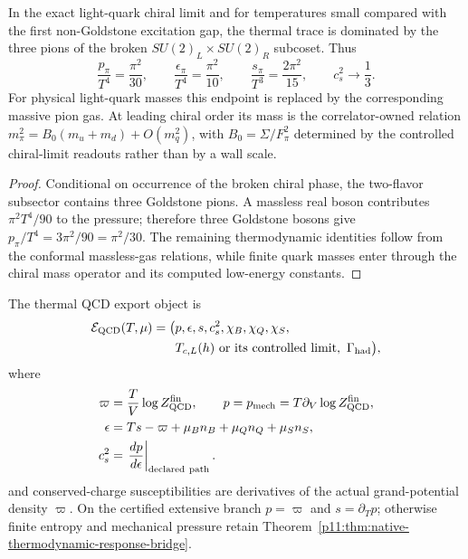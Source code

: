 \documentclass[12pt,a4paper]{article}
\begin{document}
\begin{theorem}
\label{p11:thm:native-low-temperature-pion-gas}
In the exact light-quark chiral limit and for temperatures small compared with the first non-Goldstone excitation gap, the
thermal trace is dominated by the three pions of the broken
\(SU(2)_L\times SU(2)_R\) subcoset.  Thus
\begin{equation}
\label{p11:eq:pion-gas-pressure}
\frac{p_\pi}{T^4}=\frac{\pi^2}{30},
\qquad
\frac{\epsilon_\pi}{T^4}=\frac{\pi^2}{10},
\qquad
\frac{s_\pi}{T^3}=\frac{2\pi^2}{15},
\qquad
c_s^2\to\frac13 .
\end{equation}
For physical light-quark masses this endpoint is replaced by the corresponding
massive pion gas.  At leading chiral order its mass is the correlator-owned relation
\(m_\pi^2=B_0(m_u+m_d)+O(m_q^2)\), with \(B_0=\Sigma/F_\pi^2\) determined by the controlled chiral-limit readouts rather than by a wall scale.
\end{theorem}
\begin{proof}
Conditional on occurrence of the broken chiral phase, the two-flavor subsector contains three Goldstone pions.  A massless real boson contributes \(\pi^2T^4/90\) to the pressure;
therefore three Goldstone bosons give \(p_\pi/T^4=3\pi^2/90=\pi^2/30\).  The
remaining thermodynamic identities follow from the conformal massless-gas
relations, while finite quark masses enter through the chiral mass operator and its computed low-energy constants.
\end{proof}

\begin{definition}
\label{p11:def:thermal-export-object}
The thermal QCD export object is
\begin{equation}
\label{p11:eq:thermal-export-object}
\begin{aligned}
 \mathcal E_{\rm QCD}(T,\mu)=\bigl(&p,\epsilon,s,c_s^2,
 \chi_B,\chi_Q,\chi_S,\\
 &T_{c,L}(h)\ \text{or its controlled limit},\ \Gamma_{\rm had}\bigr),
\end{aligned}
\end{equation}
where
\begin{equation}
\label{p11:eq:thermal-derivatives}
\begin{aligned}
 \varpi&=\frac{T}{V}\log Z_{\rm QCD}^{\rm fin},\qquad
 p=p_{\rm mech}=T\partial_V\log Z_{\rm QCD}^{\rm fin},\\
 \epsilon&=Ts-\varpi+\mu_Bn_B+\mu_Qn_Q+\mu_Sn_S,\\
 c_s^2&=\left.{dp\over d\epsilon}\right|_{\rm declared\ path}.
\end{aligned}
\end{equation}
and conserved-charge susceptibilities are derivatives of the actual
grand-potential density $\varpi$. On the certified extensive branch
$p=\varpi$ and $s=\partial_Tp$; otherwise finite entropy and mechanical
pressure retain Theorem~\ref{p11:thm:native-thermodynamic-response-bridge}.
\end{definition}
\end{document}
